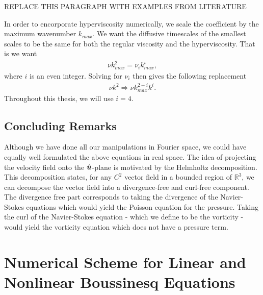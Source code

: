 REPLACE THIS PARAGRAPH WITH EXAMPLES FROM LITERATURE

In order to encorporate hyperviscosity numerically, we scale the coefficient by the maximum wavenumber $k_{max}$. We want the diffusive timescales of the smallest scales to be the same for both the regular viscosity and the hyperviscosity. That is we want 
\begin{align}
\nu k_{max}^{2} = \nu_{i}k_{max}^{i},
\end{align}
where $i$ is an even integer. Solving for $\nu_{i}$ then gives the following replacement
\begin{align}
\nu k^{2} \Rightarrow \nu k_{max}^{2-i}k^{i}.
\end{align}
Throughout this thesis, we will use $i=4$. 

\subsection{Concluding Remarks}
Although we have done all our manipulations in Fourier space, we could have equally well formulated the above equations in real space. The idea of projecting the velocity field onto the $\hat{\bm{u}}$-plane is motivated by the Helmholtz decomposition. This decomposition states, for any $C^{2}$ vector field in a bounded region of $\mathbb{R}^{3}$, we can decompose the vector field into a divergence-free and curl-free component. The divergence free part corresponds to taking the divergence of the Navier-Stokes equations which would yield the Poisson equation for the pressure. Taking the curl of the Navier-Stokes equation - which we define to be the vorticity - would yield the vorticity equation which does not have a pressure term.


\section{Numerical Scheme for Linear and Nonlinear Boussinesq Equations}
